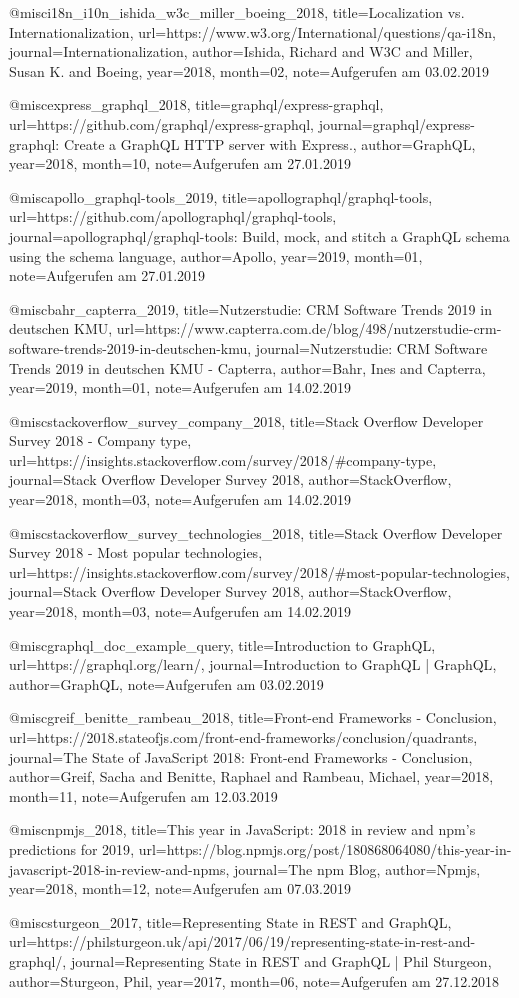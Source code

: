 
@misc{i18n_i10n_ishida_w3c_miller_boeing_2018, title={Localization vs. Internationalization}, url={https://www.w3.org/International/questions/qa-i18n}, journal={Internationalization}, author={Ishida, Richard and W3C and Miller, Susan K. and Boeing}, year={2018}, month={02}, note={Aufgerufen am 03.02.2019}}

@misc{express_graphql_2018, title={graphql/express-graphql}, url={https://github.com/graphql/express-graphql}, journal={graphql/express-graphql: Create a GraphQL HTTP server with Express.}, author={GraphQL}, year={2018}, month={10}, note={Aufgerufen am 27.01.2019}}

@misc{apollo_graphql-tools_2019, title={apollographql/graphql-tools}, url={https://github.com/apollographql/graphql-tools}, journal={apollographql/graphql-tools: Build, mock, and stitch a GraphQL schema using the schema language}, author={Apollo}, year={2019}, month={01}, note={Aufgerufen am 27.01.2019}}

@misc{bahr_capterra_2019, title={Nutzerstudie: CRM Software Trends 2019 in deutschen KMU}, url={https://www.capterra.com.de/blog/498/nutzerstudie-crm-software-trends-2019-in-deutschen-kmu}, journal={Nutzerstudie: CRM Software Trends 2019 in deutschen KMU - Capterra}, author={Bahr, Ines and Capterra}, year={2019}, month={01}, note={Aufgerufen am 14.02.2019}}

@misc{stackoverflow_survey_company_2018, title={Stack Overflow Developer Survey 2018 - Company type}, url={https://insights.stackoverflow.com/survey/2018/#company-type}, journal={Stack Overflow Developer Survey 2018}, author={StackOverflow}, year={2018}, month={03}, note={Aufgerufen am 14.02.2019}}

@misc{stackoverflow_survey_technologies_2018, title={Stack Overflow Developer Survey 2018 - Most popular technologies}, url={https://insights.stackoverflow.com/survey/2018/#most-popular-technologies}, journal={Stack Overflow Developer Survey 2018}, author={StackOverflow}, year={2018}, month={03}, note={Aufgerufen am 14.02.2019}}

@misc{graphql_doc_example_query, title={Introduction to GraphQL}, url={https://graphql.org/learn/}, journal={Introduction to GraphQL | GraphQL}, author={GraphQL}, note={Aufgerufen am 03.02.2019}}

@misc{greif_benitte_rambeau_2018, title={Front-end Frameworks - Conclusion}, url={https://2018.stateofjs.com/front-end-frameworks/conclusion/quadrants}, journal={The State of JavaScript 2018: Front-end Frameworks - Conclusion}, author={Greif, Sacha and Benitte, Raphael and Rambeau, Michael}, year={2018}, month={11}, note={Aufgerufen am 12.03.2019}}

@misc{npmjs_2018, title={This year in JavaScript: 2018 in review and npm's predictions for 2019}, url={https://blog.npmjs.org/post/180868064080/this-year-in-javascript-2018-in-review-and-npms}, journal={The npm Blog}, author={Npmjs}, year={2018}, month={12}, note={Aufgerufen am 07.03.2019}}

@misc{sturgeon_2017, title={Representing State in REST and GraphQL}, url={https://philsturgeon.uk/api/2017/06/19/representing-state-in-rest-and-graphql/}, journal={Representing State in REST and GraphQL | Phil Sturgeon}, author={Sturgeon, Phil}, year={2017}, month={06}, note={Aufgerufen am 27.12.2018}}